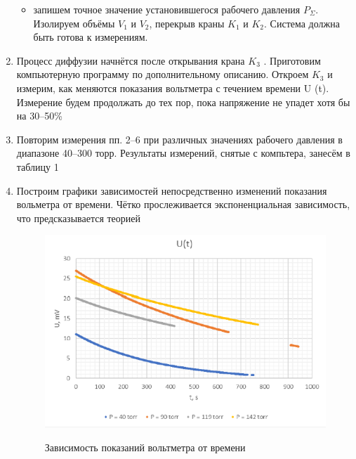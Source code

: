 \documentclass[12pt,a4paper]{article}
\begin{document}
\begin{enumerate}
\begin{itemize}
\item запишем точное значение установившегося рабочего давления $P_{\Sigma}$. Изолируем объёмы $V_1$ и $V_2$, перекрыв краны $K_1$ и $K_2$. Система должна быть готова к измерениям.
\end{itemize}
\item Процесс диффузии начнётся после открывания крана $K_3$ . Приготовим компьютерную программу по дополнительному описанию. Откроем $K_3$ и измерим, как меняются показания вольтметра с течением времени U (t). Измерение будем продолжать до тех пор, пока напряжение не упадет хотя бы на 30–50\%
\item  Повторим измерения пп. 2–6 при различных значениях рабочего давления в диапазоне 40–300 торр. Результаты измерений, снятые с компьтера, занесём в таблицу 1

\item Построим графики зависимостей непосредственно изменений показания вольметра от времени. Чётко прослеживается экспоненциальная зависимость, что предсказывается теорией
\begin{figure}[h]
    \centering
    \begin{center}
    \caption{Зависимость показаний вольтметра от времени }
    \end{center}
    \includegraphics[width=\textwidth]{exp.PNG}
    \label{fig:vac}
\end{figure} 


\end{enumerate}
\end{document}
